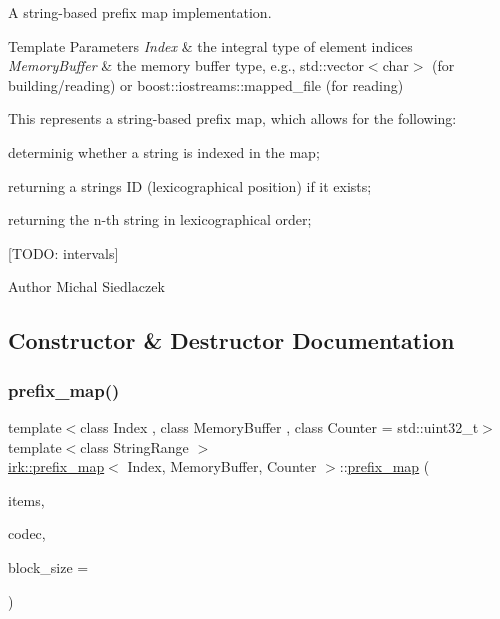 A string-\/based prefix map implementation. 


\begin{DoxyTemplParams}{Template Parameters}
{\em Index} & the integral type of element indices \\
\hline
{\em Memory\+Buffer} & the memory buffer type, e.\+g., {\ttfamily std\+::vector$<$char$>$} (for building/reading) or {\ttfamily boost\+::iostreams\+::mapped\+\_\+file} (for reading)\\
\hline
\end{DoxyTemplParams}
This represents a string-\/based prefix map, which allows for the following\+:
\begin{DoxyItemize}
\item determinig whether a string is indexed in the map;
\item returning a string\textquotesingle{}s ID (lexicographical position) if it exists;
\item returning the n-\/th string in lexicographical order;
\item \mbox{[}T\+O\+DO\+: intervals\mbox{]}
\end{DoxyItemize}

\begin{DoxyAuthor}{Author}
Michal Siedlaczek 
\end{DoxyAuthor}


\subsection{Constructor \& Destructor Documentation}
\mbox{\label{classirk_1_1prefix__map_a0fbeb344ad4a076d200023a9fc72d359}} 
\subsubsection{\texorpdfstring{prefix\+\_\+map()}{prefix\_map()}}
{\footnotesize\ttfamily template$<$class Index , class Memory\+Buffer , class Counter  = std\+::uint32\+\_\+t$>$ \\
template$<$class String\+Range $>$ \\
\mbox{\hyperlink{classirk_1_1prefix__map}{irk\+::prefix\+\_\+map}}$<$ Index, Memory\+Buffer, Counter $>$\+::\mbox{\hyperlink{classirk_1_1prefix__map}{prefix\+\_\+map}} (\begin{DoxyParamCaption}\item[{String\+Range}]{items,  }\item[{const std\+::shared\+\_\+ptr$<$ \mbox{\hyperlink{classirk_1_1coding_1_1hutucker__codec}{irk\+::coding\+::hutucker\+\_\+codec}}$<$ char $>$$>$}]{codec,  }\item[{std\+::size\+\_\+t}]{block\+\_\+size = {} }\end{DoxyParamCaption})\hspace{0.3cm}{\ttfamily [inline]}}



